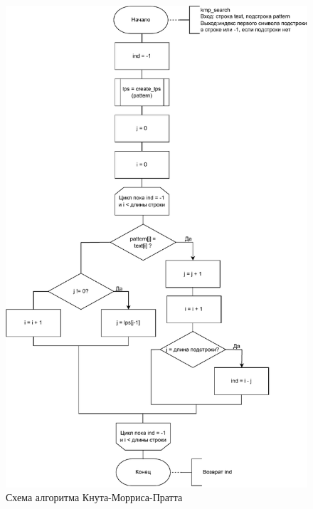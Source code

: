 \begin{figure}[h!]
	\centering
	\includegraphics[width=0.9\linewidth]{img/kmp}
	\caption{Схема алгоритма Кнута-Морриса-Пратта}
	\label{fig:kmp}
\end{figure}

